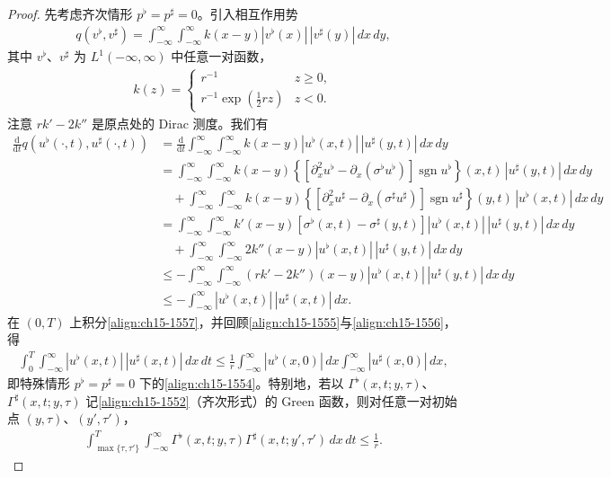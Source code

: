\documentclass[../../main.tex]{subfiles}
\begin{document}
\begin{proof}
先考虑齐次情形 $p^\flat=p^\sharp=0$。引入相互作用势
\begin{align}
q(v^\flat,v^\sharp)=\int_{-\infty}^{\infty}\int_{-\infty}^{\infty}k(x-y)|v^\flat(x)|\,|v^\sharp(y)|\,dx\,dy,
\label{align:ch15-1555}
\end{align}
其中 $v^\flat$、$v^\sharp$ 为 $L^1(-\infty,\infty)$ 中任意一对函数，
\begin{align}
k(z)=
\begin{cases}
r^{-1}&z\geqslant0,\\
r^{-1}\exp\left(\frac12rz\right)&z<0.
\end{cases}
\label{align:ch15-1556}
\end{align}
注意 $rk'-2k''$ 是原点处的 Dirac 测度。我们有
\begin{align}
\frac{\mathrm{d}}{\mathrm{d}t}q(u^\flat(\cdot,t),u^\sharp(\cdot,t))&=\frac{\mathrm{d}}{\mathrm{d}t}\int_{-\infty}^{\infty}\int_{-\infty}^{\infty}k(x-y)|u^\flat(x,t)|\,|u^\sharp(y,t)|\,dx\,dy\nonumber\\
&=\int_{-\infty}^{\infty}\int_{-\infty}^{\infty}k(x-y)\left\{\left[\partial_x^2u^\flat-\partial_x(\sigma^\flat u^\flat)\right]\operatorname{sgn}u^\flat\right\}(x,t)\,|u^\sharp(y,t)|\,dx\,dy\nonumber\\
&\quad+\int_{-\infty}^{\infty}\int_{-\infty}^{\infty}k(x-y)\left\{\left[\partial_x^2u^\sharp-\partial_x(\sigma^\sharp u^\sharp)\right]\operatorname{sgn}u^\sharp\right\}(y,t)\,|u^\flat(x,t)|\,dx\,dy\nonumber\\
&=\int_{-\infty}^{\infty}\int_{-\infty}^{\infty}k'(x-y)\left[\sigma^\flat(x,t)-\sigma^\sharp(y,t)\right]|u^\flat(x,t)|\,|u^\sharp(y,t)|\,dx\,dy\nonumber\\
&\quad+\int_{-\infty}^{\infty}\int_{-\infty}^{\infty}2k''(x-y)|u^\flat(x,t)|\,|u^\sharp(y,t)|\,dx\,dy\nonumber\\
&\leqslant-\int_{-\infty}^{\infty}\int_{-\infty}^{\infty}(rk'-2k'')(x-y)|u^\flat(x,t)|\,|u^\sharp(y,t)|\,dx\,dy\nonumber\\
&\leqslant-\int_{-\infty}^{\infty}|u^\flat(x,t)|\,|u^\sharp(x,t)|\,dx.
\label{align:ch15-1557}
\end{align}
在 $(0,T)$ 上积分\eqref{align:ch15-1557}，并回顾\eqref{align:ch15-1555}与\eqref{align:ch15-1556}，得
\begin{align}
\int_0^T\int_{-\infty}^{\infty}|u^\flat(x,t)|\,|u^\sharp(x,t)|\,dx\,dt\leqslant\frac1r\int_{-\infty}^{\infty}|u^\flat(x,0)|\,dx\int_{-\infty}^{\infty}|u^\sharp(x,0)|\,dx,
\label{align:ch15-1558}
\end{align}
即特殊情形 $p^\flat=p^\sharp=0$ 下的\eqref{align:ch15-1554}。特别地，若以 $\Gamma^\flat(x,t;y,\tau)$、$\Gamma^\sharp(x,t;y,\tau)$ 记\eqref{align:ch15-1552}（齐次形式）的 Green 函数，则对任意一对初始点 $(y,\tau)$、$(y',\tau')$，
\begin{align}
\int_{\max\{\tau,\tau'\}}^T\int_{-\infty}^{\infty}\Gamma^\flat(x,t;y,\tau)\Gamma^\sharp(x,t;y',\tau')\,dx\,dt\leqslant\frac1r.
\label{align:ch15-1559}
\end{align}


\end{proof}
\end{document}
